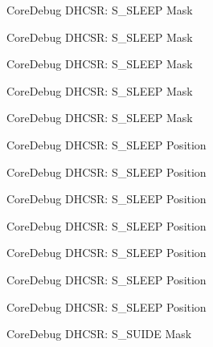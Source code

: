 \begin{DoxyRefList}
\label{deprecated__deprecated000170}%
%
Core\+Debug D\+H\+C\+SR\+: S\+\_\+\+S\+L\+E\+EP Mask 

\label{deprecated__deprecated000255}%
%
Core\+Debug D\+H\+C\+SR\+: S\+\_\+\+S\+L\+E\+EP Mask 

\label{deprecated__deprecated000312}%
%
Core\+Debug D\+H\+C\+SR\+: S\+\_\+\+S\+L\+E\+EP Mask 

\label{deprecated__deprecated000388}%
%
Core\+Debug D\+H\+C\+SR\+: S\+\_\+\+S\+L\+E\+EP Mask 

\label{deprecated__deprecated000475}%
%
Core\+Debug D\+H\+C\+SR\+: S\+\_\+\+S\+L\+E\+EP Mask  
\item[Member \mbox{\hyperlink{group__CMSIS__CoreDebug_ga349ccea33accc705595624c2d334fbcb}{Core\+Debug\+\_\+\+D\+H\+C\+S\+R\+\_\+\+S\+\_\+\+S\+L\+E\+E\+P\+\_\+\+Pos}} ]\label{deprecated__deprecated000023}%
%
Core\+Debug D\+H\+C\+SR\+: S\+\_\+\+S\+L\+E\+EP Position 

\label{deprecated__deprecated000115}%
%
Core\+Debug D\+H\+C\+SR\+: S\+\_\+\+S\+L\+E\+EP Position 

\label{deprecated__deprecated000169}%
%
Core\+Debug D\+H\+C\+SR\+: S\+\_\+\+S\+L\+E\+EP Position 

\label{deprecated__deprecated000254}%
%
Core\+Debug D\+H\+C\+SR\+: S\+\_\+\+S\+L\+E\+EP Position 

\label{deprecated__deprecated000311}%
%
Core\+Debug D\+H\+C\+SR\+: S\+\_\+\+S\+L\+E\+EP Position 

\label{deprecated__deprecated000387}%
%
Core\+Debug D\+H\+C\+SR\+: S\+\_\+\+S\+L\+E\+EP Position 

\label{deprecated__deprecated000474}%
%
Core\+Debug D\+H\+C\+SR\+: S\+\_\+\+S\+L\+E\+EP Position  
\item[Member \mbox{\hyperlink{group__CMSIS__CoreDebug_gad37656791dbb216ffb194995f28c412c}{Core\+Debug\+\_\+\+D\+H\+C\+S\+R\+\_\+\+S\+\_\+\+S\+U\+I\+D\+E\+\_\+\+Msk}} ]\label{deprecated__deprecated000016}%
%
Core\+Debug D\+H\+C\+SR\+: S\+\_\+\+S\+U\+I\+DE Mask 


\end{DoxyRefList}
